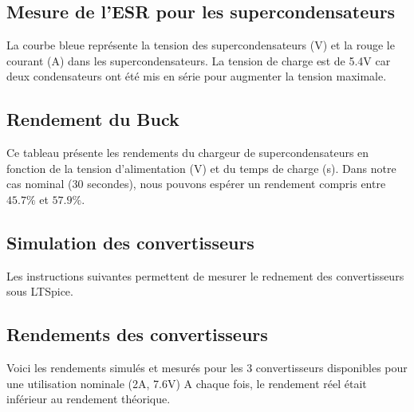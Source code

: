 \subsection{Mesure de l'ESR pour les supercondensateurs}
La courbe bleue représente la tension des supercondensateurs (V) et la rouge le courant (A) dans les supercondensateurs. La tension de charge est de 5.4V car deux condensateurs ont été mis en série pour augmenter la tension maximale.


\subsection{Rendement du Buck}


Ce tableau présente les rendements du chargeur de supercondensateurs en fonction de la tension d'alimentation (V) et du temps de charge (s).
Dans notre cas nominal (30 secondes), nous pouvons espérer un rendement compris entre $45.7\%$ et $57.9\%$.



\subsection{Simulation des convertisseurs}
\label{meas}

Les instructions suivantes permettent de mesurer le rednement des convertisseurs sous LTSpice.


\subsection{Rendements des convertisseurs}

Voici les rendements simulés et mesurés pour les 3 convertisseurs disponibles pour une utilisation nominale (2A, 7.6V)
A chaque fois, le rendement réel était inférieur au rendement théorique.

